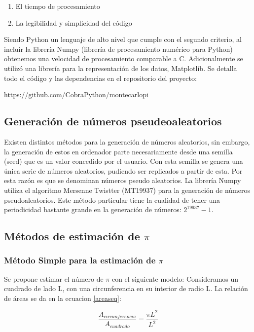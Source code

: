 \documentclass{rbf}
\begin{document}
\begin{enumerate}
    \item El tiempo de procesamiento
    \item La legibilidad y simplicidad del código
\end{enumerate}


Siendo Python un lenguaje de alto nivel que cumple con el segundo criterio, al incluir la librería Numpy (librería de procesamiento numérico para Python) obtenemos una velocidad de procesamiento comparable a C. Adicionalmente se utilizó una librería para la representación de los datos, Matplotlib.
Se detalla todo el código y las dependencias en el repositorio del proyecto:

https://github.com/CobraPython/montecarlopi

\subsection{Generación de números pseudeoaleatorios}

Existen distintos métodos para la generación de números aleatorios, sin embargo, la generación de estos en ordenador parte necesariamente desde una semilla (seed) que es un valor concedido por el usuario. Con esta semilla se genera una única serie de números aleatorios, pudiendo ser replicados a partir de esta. Por esta razón es que se denominan números pseudo aleatorios.
La librería Numpy utiliza el algoritmo Mersenne Twistter\cite{Tanguy} (MT19937) para la generación de números pseudoaleatorios. Este método particular tiene la cualidad de tener una periodicidad bastante grande en la generación de números: $2^19937-1$\cite{Makoto}.

\subsection{Métodos de estimación de $\pi$}
\subsubsection{Método Simple para la estimación de $\pi$}

Se propone estimar el número de $\pi$ con el siguiente modelo:
Consideramos un cuadrado de lado L, con una circunferencia en su interior de radio L.
La relación de áreas se da en la ecuacion \ref{areaseq}:

\begin{equation}
	\frac{A_{circunferencia}}{A_{cuadrado}}=\frac{\pi L^2}{L^2}
\label{areaseq}	
\end{equation}
\end{document}
